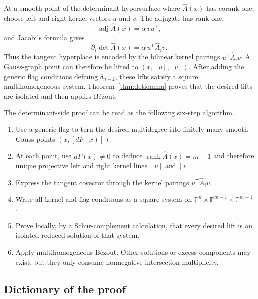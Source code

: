 \documentclass[acmsmall,screen,nonacm]{acmart}
\theoremstyle{definition}
\theoremstyle{remark}
\DeclareMathOperator{\rank}{rank}
\DeclareMathOperator{\adj}{adj}
\newcommand{\PP}{\mathbb{P}}
\newcommand{\pdeg}{\delta}
\begin{document}
At a smooth point of the determinant hypersurface where $\widehat A(x)$ has corank one, choose left and right kernel vectors $u$ and $v$.  The adjugate has rank one,
\[
  \adj\widehat A(x)=\alpha\,v u^{\mathsf T},
\]
and Jacobi's formula gives
\[
  \partial_i\det\widehat A(x)=\alpha\,u^{\mathsf T}\widehat A_i v.
\]
Thus the tangent hyperplane is encoded by the bilinear kernel pairings $u^{\mathsf T}\widehat A_i v$.  A Gauss-graph point can therefore be lifted to $(x,[u],[v])$.  After adding the generic flag conditions defining $\pdeg_{n-2}$, these lifts satisfy a square multihomogeneous system.  Theorem~\ref{thm:detlemma} proves that the desired lifts are isolated and then applies B\'ezout.

The determinant-side proof can be read as the following six-step algorithm.
\begin{enumerate}[leftmargin=2.2em,itemsep=2pt]
\item Use a generic flag to turn the desired multidegree into finitely many
smooth Gauss points $(x,[dF(x)])$.
\item At each point, use $dF(x)\ne0$ to deduce
$\rank\widehat A(x)=m-1$ and therefore unique projective left and right
kernel lines $[u]$ and $[v]$.
\item Express the tangent covector through the kernel pairings
$u^{\mathsf T}\widehat A_i v$.
\item Write all kernel and flag conditions as a square system on
$\PP^n\times\PP^{m-1}\times\PP^{m-1}$.
\item Prove locally, by a Schur-complement calculation, that every desired
lift is an isolated reduced solution of that system.
\item Apply multihomogeneous B\'ezout.  Other solutions or excess components
may exist, but they only consume nonnegative intersection multiplicity.
\end{enumerate}

\subsection{Dictionary of the proof}
\end{document}
